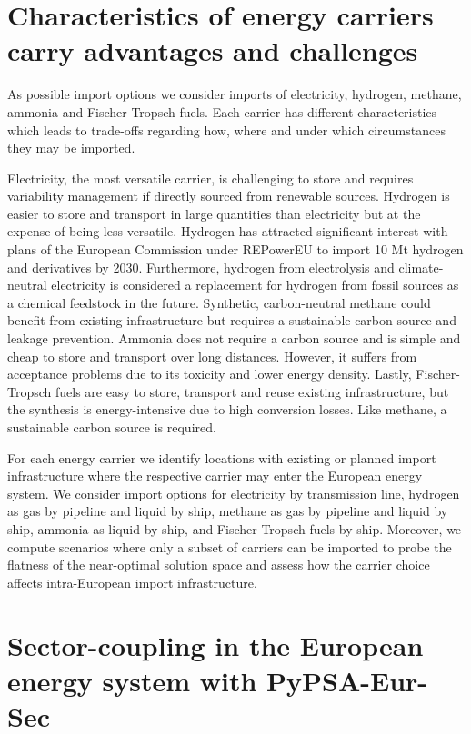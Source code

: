 \documentclass[12pt,3p]{elsarticle}
\begin{document}
\section*{Characteristics of energy carriers carry advantages and challenges}

As possible import options we consider imports of electricity, hydrogen,
methane, ammonia and Fischer-Tropsch fuels. Each carrier has different
characteristics which leads to trade-offs regarding how, where and under which
circumstances they may be imported.

Electricity, the most versatile carrier, is challenging to store and requires
variability management if directly sourced from renewable sources. Hydrogen is
easier to store and transport in large quantities than electricity but at the
expense of being less versatile. Hydrogen has attracted significant interest
with plans of the European Commission under REPowerEU \cite{europeancommissionRepowerEUPlan} to import 10 Mt hydrogen
and derivatives by 2030. Furthermore, hydrogen from electrolysis and
climate-neutral electricity is considered a replacement for hydrogen from fossil
sources as a chemical feedstock in the future. Synthetic, carbon-neutral methane
could benefit from existing infrastructure but requires a sustainable carbon
source and leakage prevention. Ammonia does not require a carbon source and is
simple and cheap to store and transport over long distances. However, it suffers
from acceptance problems due to its toxicity and lower energy density. Lastly,
Fischer-Tropsch fuels are easy to store, transport and reuse existing
infrastructure, but the synthesis is energy-intensive due to high conversion
losses. Like methane, a sustainable carbon source is required.

For each energy carrier we identify locations with existing or planned import
infrastructure where the respective carrier may enter the European energy
system. We consider import options for electricity by transmission line,
hydrogen as gas by pipeline and liquid by ship, methane as gas by pipeline and
liquid by ship, ammonia as liquid by ship, and Fischer-Tropsch fuels by ship.
Moreover, we compute scenarios where only a subset of carriers can be imported
to probe the flatness of the near-optimal solution space and assess how the
carrier choice affects intra-European import infrastructure.

\section*{Sector-coupling in the European energy system with PyPSA-Eur-Sec}
\end{document}
